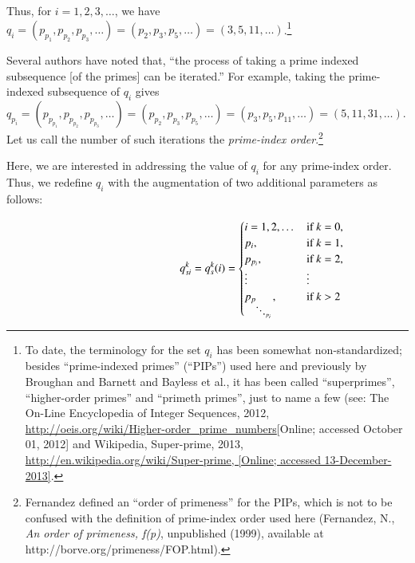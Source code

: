 \documentclass[12pt,longtitle,times]{amsart}
\begin{document}
  Thus, for $i = 1,2,3,\dots$, we have $q_i = \left(p_{p_1},p_{p_2},p_{p_3},\dots\right) = \left(p_2,p_3,p_5,\dots\right) = \left(3,5,11,\dots\right)$.\footnote{To date, the terminology for the set $q_i$ has been somewhat non-standardized; besides ``prime-indexed primes'' (``PIPs'') used here and previously by Broughan and Barnett\cite{Broughan2009} and Bayless et al.,\cite{Bayless2013} it has been called ``superprimes'', ``higher-order primes'' and ``primeth primes'', just to name a few (see: The On-Line Encyclopedia of Integer Sequences, 2012, \url{http://oeis.org/wiki/Higher-order_prime_numbers}[Online; accessed October 01, 2012] and Wikipedia, Super-prime, 2013, \url{http://en.wikipedia.org/wiki/Super-prime, [Online; accessed  13-December-2013]}.}
  
Several authors have noted that, ``the process of taking a prime indexed subsequence [of the primes] can be iterated.''\cite{Broughan2009} For example, taking the prime-indexed subsequence of $q_i$ gives $q_{p_i} = \left(p_{p_{p_1}},p_{p_{p_2}},p_{p_{p_3}},\dots\right) = \left(p_{p_2},p_{p_3},p_{p_5},\dots\right) = \left(p_3,p_5,p_{11},\dots\right) = \left(5,11,31,\dots\right)$. Let us call the number of such iterations the \textit{prime-index order}.\footnote{Fernandez defined an ``order of primeness'' for the PIPs, which is not to be confused with the definition of prime-index order used here (Fernandez, N., \textit{An order of primeness, f(p)}, unpublished (1999), available at http://borve.org/primeness/FOP.html).}

Here, we are interested in addressing the value of $q_i$ for any prime-index order. Thus, we redefine $q_i$ with the augmentation of two additional parameters as follows:

\begin{singlespace}
\begin{equation}
\centering
\hphantom{------------}q_{si}^k = q_s^{k}(i)=
\begin{cases}\label{eq:Cases}
    i=1,2,\dots        & \text{if } k = 0,\\
    p_i,             & \text{if } k = 1,\\
    p_{p_i},         & \text{if } k = 2,\\
    \vdots          & \vdots\\
    p_{p_{\ddots_{p_i}}},   & \text{if } k > 2                
\end{cases} 
\end{equation}
\end{singlespace}
\end{document}
